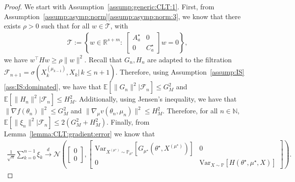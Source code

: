\documentclass[11pt,a4paper]{article}
\theoremstyle{definition}
\begin{document}
\begin{proof}
We start with Assumption~\ref{assump:generic:CLT:1}. First, from Assumption~\ref{assump:asymp:norm}\ref{assump:asymp:norm:3}, we know that there exists $\rho > 0$ such that for all $w \in \mathcal T$, with
\begin{align*}
    \mathcal T := \left\{ w \in \mathbb R^{s+m}:\; \begin{bmatrix} A^\star_a & 0 \\ 0 & C^\star_a \end{bmatrix} w = 0 \right\},
\end{align*}
we have $w^\top H w \geq \rho \|w\|^2$. Recall that $G_n, H_n$ are adapted to the filtration $\mathcal F_{n+1} = \sigma(X_k^{(\mu_{k-1})}, X_k |\, k \leq n+1)$. Therefore, using Assumption~\ref{assump:IS}\ref{ass:IS:dominated}, we have that $\mathbb E[\|G_n\|^2 | \mathcal F_n] \leq G_M^2$ and $\mathbb E[\|H_n\|^2 | \mathcal F_n] \leq H_M^2$. Additionally, using Jensen's inequality, we have that $\|\nabla {f}(\theta_n)\|^2 \leq G_M^2$ and $\|\nabla_\mu v(\theta_n,\mu_n)\|^2 \leq H_M^2$. Therefore, for all $n \in \mathbb N$, $\mathbb E \left[ \|\xi_n\|^2 | \mathcal F_n\right] \leq 2 (G_M^2 + H_M^2)$. Finally, from Lemma~\ref{lemma:CLT:gradient:error} we know that 
\begin{align*}
    \frac{1}{\sqrt{n}} \sum_{k=0}^{n-1} \xi_k \overset{d}{\to} \mathcal N \left( \begin{bmatrix} 0 \\ 0 \end{bmatrix}, \begin{bmatrix}
        \text{Var}_{X^{(\mu^\star)} \sim \mathbb P_{\mu^\star}}\left[ G_{\mu^\star}(\theta^\star,X^{(\mu^\star)})\right] & 0 \\ 0 & \text{Var}_{X \sim \mathbb P}\left[ H(\theta^\star, \mu^\star, X)\right]
    \end{bmatrix}\right).
\end{align*}


\end{proof}
\end{document}
